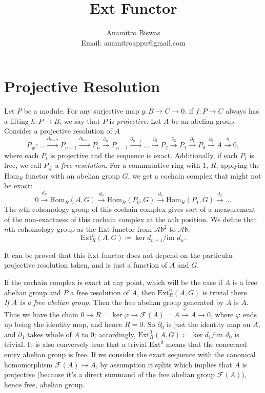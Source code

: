 \documentclass[a4paper,11pt, tikz]{article}
\newcommand{\lb}{\left(}
\newcommand{\rb}{\right)}
\newcommand{\Ab}{\mathcal{A}\mathfrak{b}}
\newcommand{\f}{\varphi}
\newcommand{\y}{\eta}
\newcommand{\dl}{\partial}
\newcommand{\Hom}{\text{Hom}}
\newcommand{\Ext}{\text{Ext}}
\newcommand{\im}{\text{im~}}
\newcommand{\cF}{\mathcal{F}}
\newcommand{\tends}{\rightarrow}
\begin{document}
\title{Ext Functor}
\author{Anamitro Biswas\\Email: anamitroappu@gmail.com}
\maketitle
\section{Projective Resolution}
\noindent{}Let $P$ be a module. For any surjective map $g:B\tends C\tends 0$. if $f:P\tends C$ always has a lifting $h:P\tends B$, we say that $P$ is \emph{projective}.
Let $A$ be an abelian group. Consider a projective resolution of $A$
$$P_\#: \dots\xrightarrow{\dl_{n+2}} P_{n+1}\xrightarrow{\dl_{n+1}} P_n\xrightarrow{\dl_{n}} P_{n-1}\xrightarrow{\dl_{n-1}}\dots\xrightarrow{\dl_{3}} P_2\xrightarrow{\dl_{2}} P_1\xrightarrow{\dl_{1}} P_0\xrightarrow{\dl_{0}} A\xrightarrow{\eta} 0,$$
where each $P_i$ is projective and the sequence is exact. Additionally, if each $P_i$ is free, we call $P_\#$ a \emph{free resolution}.
For a commutative ring with $1$, $R$, applying the $\Hom_R$ functor with an abelian group $G$, we get a cochain complex that might not be exact:
$$0\xrightarrow{d_{\y}}\Hom_R\lb A, G\rb\xrightarrow{d_{0}}\Hom_R\lb P_0, G\rb\xrightarrow{d_{1}}\Hom_R\lb P_1, G\rb\xrightarrow{d_{2}}\dots$$
The $n$th cohomology group of this cochain complex gives sort of a measurement of the non-exactness of this cochain complex at the $n$th position. We define that $n$th cohomology group as the $\Ext$ functor from $\Ab^2$ to $\Ab$,
$$\Ext_R^n\lb A, G\rb\coloneq \ker d_{n+1}/\im d_n.$$

It can be proved that this $\Ext$ functor does not depend on the particular projective resolution taken, and is just a function of $A$ and $G$.

If the cochain complex is exact at any point, which will be the case if $A$ is a free abelian group and $P$ a free resolution of $A$, then $\Ext_R^n\lb A, G\rb$ is trivial there.\\

\noindent{}\textit{If $A$ is a free abelian group.} Then the free abelian group generated by $A$ is $A$. Thus we have the chain $0\xrightarrow{} R=\ker\f\xrightarrow{} \cF(A)=A\xrightarrow{\f} A\xrightarrow{} 0$, where $\f$ ends up being the identity map, and hence $R=0$. So $\dl_0$ is just the identity map on $A$, and $\dl_1$ takes whole of $A$ to $0$; accordingly, $\Ext_R^0\lb A, G\rb\coloneq \ker d_{1}/\im d_0$ is trivial. It is also conversely true that a trivial $\Ext^0$ means that the concerned entry abelian group is free. If we consider the exact sequence with the canonical homomorphism $\cF(A)\tends A$, by assumption it splits which implies that $A$ is projective (because it's a direct summand of the free abelian group $\cF(A)$), hence free, abelian group.\\
\end{document}
